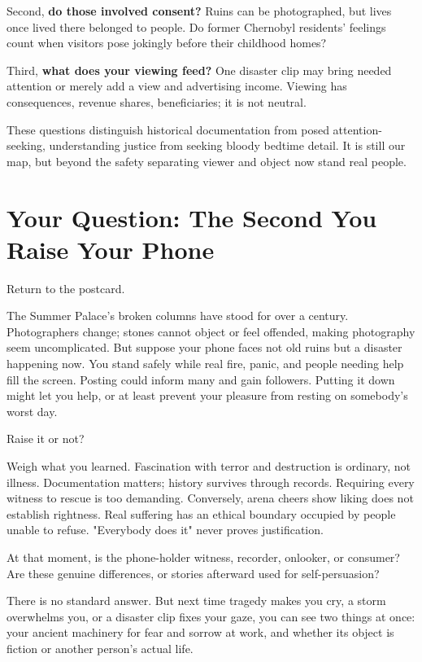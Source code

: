 Second, \textbf{do those involved consent?} Ruins can be photographed, but lives once lived there belonged to people. Do former Chernobyl residents' feelings count when visitors pose jokingly before their childhood homes?

Third, \textbf{what does your viewing feed?} One disaster clip may bring needed attention or merely add a view and advertising income. Viewing has consequences, revenue shares, beneficiaries; it is not neutral.

These questions distinguish historical documentation from posed attention-seeking, understanding justice from seeking bloody bedtime detail. It is still our map, but beyond the safety separating viewer and object now stand real people.

\section[The Second You Raise Your Phone]{Your Question: The Second You Raise Your Phone}
Return to the postcard.

The Summer Palace's broken columns have stood for over a century. Photographers change; stones cannot object or feel offended, making photography seem uncomplicated. But suppose your phone faces not old ruins but a disaster happening now. You stand safely while real fire, panic, and people needing help fill the screen. Posting could inform many and gain followers. Putting it down might let you help, or at least prevent your pleasure from resting on somebody's worst day.

Raise it or not?

Weigh what you learned. Fascination with terror and destruction is ordinary, not illness. Documentation matters; history survives through records. Requiring every witness to rescue is too demanding. Conversely, arena cheers show liking does not establish rightness. Real suffering has an ethical boundary occupied by people unable to refuse. "Everybody does it" never proves justification.

At that moment, is the phone-holder witness, recorder, onlooker, or consumer? Are these genuine differences, or stories afterward used for self-persuasion?

There is no standard answer. But next time tragedy makes you cry, a storm overwhelms you, or a disaster clip fixes your gaze, you can see two things at once: your ancient machinery for fear and sorrow at work, and whether its object is fiction or another person's actual life.

